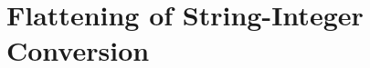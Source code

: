 \documentclass[sigplan,review,anonymous]{acmart}\settopmatter{printfolios=true,printccs=false,printacmref=false}
\begin{document}
%
%
%
%
%
%
%
%
%



\section{Flattening of String-Integer Conversion} \label{section:s2i}
\end{document}
